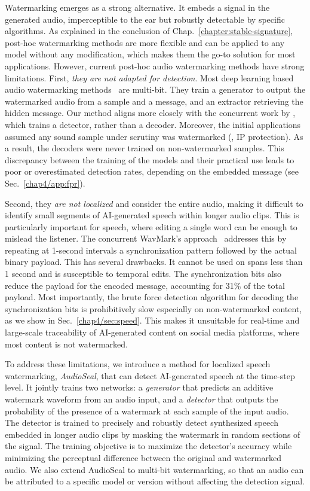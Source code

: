 Watermarking emerges as a strong alternative.
It embeds a signal in the generated audio, imperceptible to the ear but robustly detectable by specific algorithms.
As explained in the conclusion of Chap.~\ref{chapter:stable-signature}, post-hoc watermarking methods are more flexible and can be applied to any model without any modification, which makes them the go-to solution for most applications.
However, current post-hoc audio watermarking methods have strong limitations.
First, \emph{they are not adapted for detection}.
Most deep learning based audio watermarking methods~\citep{pavlovic2022robust, DEAR_Liu0FMZY23, chen2023wavmark} are multi-bit.
They train a generator to output the watermarked audio from a sample and a message, and an extractor retrieving the hidden message.
Our method aligns more closely with the concurrent work by \citet{juvela2023collaborative}, which trains a detector, rather than a decoder.
Moreover, the initial applications assumed any sound sample under scrutiny was watermarked (\eg, IP protection).
As a result, the decoders were never trained on non-watermarked samples.
This discrepancy between the training of the models and their practical use leads to poor or overestimated detection rates, depending on the embedded message (see Sec.~\ref{chap4/app:fpr}).

Second, they \emph{are not localized} and consider the entire audio, making it difficult to identify small segments of AI-generated speech within longer audio clips. 
This is particularly important for speech, where editing a single word can be enough to mislead the listener.
The concurrent WavMark's approach~\citep{chen2023wavmark} addresses this by repeating at 1-second intervals a synchronization pattern followed by the actual binary payload. 
This has several drawbacks. 
It cannot be used on spans less than 1 second and is susceptible to temporal edits. 
The synchronization bits also reduce the payload for the encoded message, accounting for 31\% of the total payload. 
Most importantly, the brute force detection algorithm for decoding the synchronization bits is prohibitively slow especially on non-watermarked content, as we show in Sec.~\ref{chap4/sec:speed}.
This makes it unsuitable for real-time and large-scale traceability of AI-generated content on social media platforms, where most content is not watermarked.

To address these limitations, we introduce a method for localized speech watermarking, \emph{AudioSeal}, that can detect AI-generated speech at the time-step level.
It jointly trains two networks: a \emph{generator} that predicts an additive watermark waveform from an audio input, and a \emph{detector} that outputs the probability of the presence of a watermark at each sample of the input audio. 
The detector is trained to precisely and robustly detect synthesized speech embedded in longer audio clips by masking the watermark in random sections of the signal.
The training objective is to maximize the detector's accuracy while minimizing the perceptual difference between the original and watermarked audio. 
We also extend AudioSeal to multi-bit watermarking, so that an audio can be attributed to a specific model or version without affecting the detection signal.

